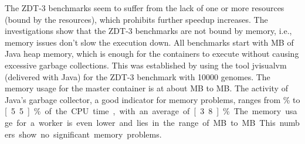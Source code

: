 The ZDT-3 benchmarks seem to suffer from the lack of one or more resources (bound by the resources), which prohibits further speedup increases. The investigations show that the ZDT-3 benchmarks are not bound by memory, i.e., memory issues don't slow the execution down. All benchmarks start with \unit[256]{MB} of Java heap memory, which is enough for the containers to execute without causing excessive garbage collections. This was established by using the tool jvisualvm (delivered with Java) for the ZDT-3 benchmark with 10000 genomes. The memory usage for the master container is at about \unit[100]{MB} to \unit[150]{MB}. The activity of Java's garbage collector, a good indicator for memory problems, ranges from \unit[3]{\%} to \unit[5.5]{\%} of the CPU time, with an average of \unit[3.8]{\%}. The memory usage for a worker is even lower and lies in the range of \unit[5]{MB} to \unit[30]{MB}. This numbers show no significant memory problems.

